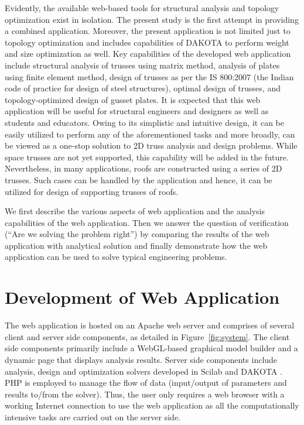 \documentclass[preprint]{elsarticle}
\begin{document}
Evidently, the available web-based tools for structural analysis and
topology optimization exist in isolation. The present study is the first attempt
in providing a combined application. Moreover, the present application is not
limited just to topology optimization and includes capabilities of DAKOTA
\cite{adams2006dakota} to perform weight and size optimization as well. Key
capabilities of the developed web application include structural analysis of
trusses using matrix method, analysis of plates using finite element method,
design of trusses as per the IS 800:2007 \cite{IS800} (the Indian code of
practice for design of steel structures), optimal design of trusses, and
topology-optimized design
of gusset plates. It is expected that this web application will be
useful for structural engineers and designers as well as students and educators.
Owing to its simplistic and intuitive design, it can be easily utilized to
perform any of the aforementioned tasks and more broadly, can be viewed as a
one-stop solution to 2D truss analysis and design problems. While space trusses
are not yet supported, this capability will be added in the future.
Nevertheless, in many applications, roofs are constructed using a series of 2D
trusses. Such cases can be handled by the application and hence, it can be
utilized for design of supporting trusses of roofs.

We first describe the various aspects of web application and the analysis
capabilities of the web application. Then we answer the question of verification
(``Are we solving the problem right'') by comparing the results of
the web application with analytical solution and finally demonstrate how the web
application can be used to solve typical engineering problems.

\section{Development of Web Application} 
\label{WebApp}
The web application is hosted on an Apache web server and comprises of several
client and server side components, as detailed in Figure~\ref{fig:system}. The
client side components primarily include a WebGL-based graphical model builder
and a dynamic page that displays analysis results. Server side components
include analysis, design and optimization solvers developed in Scilab
\cite{ScilabEnterprises2012} and DAKOTA \cite{adams2006dakota}. PHP is employed
to manage the flow of data (input/output of parameters and results to/from the
solver). Thus, the user only requires a web browser with a working Internet
connection to use the web application as all the computationally intensive tasks
are carried out on the server side.
\end{document}
